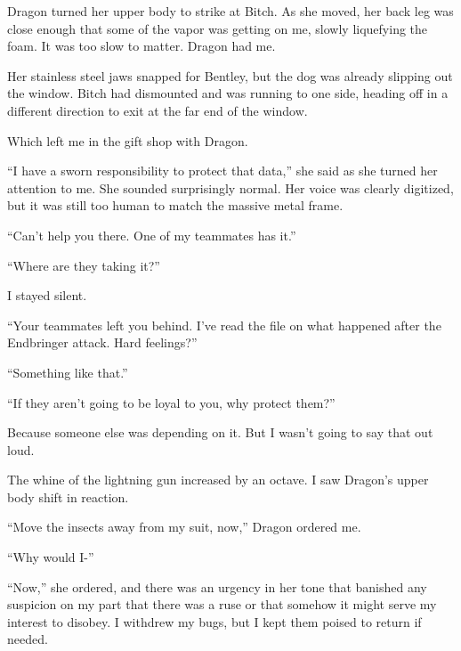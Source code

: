 Dragon turned her upper body to strike at Bitch.  As she moved, her back leg was close enough that some of the vapor was getting on me, slowly liquefying the foam.  It was too slow to matter.  Dragon had me.



Her stainless steel jaws snapped for Bentley, but the dog was already slipping out the window.  Bitch had dismounted and was running to one side, heading off in a different direction to exit at the far end of the window.



Which left me in the gift shop with Dragon.



``I have a sworn responsibility to protect that data,'' she said as she turned her attention to me.  She sounded surprisingly normal.  Her voice was clearly digitized, but it was still too human to match the massive metal frame.



``Can't help you there.  One of my teammates has it.''



``Where are they taking it?''



I stayed silent.



``Your teammates left you behind.  I've read the file on what happened after the Endbringer attack.  Hard feelings?''



``Something like that.''



``If they aren't going to be loyal to you, why protect them?''



Because someone else was depending on it.  But I wasn't going to say that out loud.



The whine of the lightning gun increased by an octave.  I saw Dragon's upper body shift in reaction.



``Move the insects away from my suit, now,'' Dragon ordered me.



``Why would I-''



``Now,'' she ordered, and there was an urgency in her tone that banished any suspicion on my part that there was a ruse or that somehow it might serve my interest to disobey.  I withdrew my bugs, but I kept them poised to return if needed.



